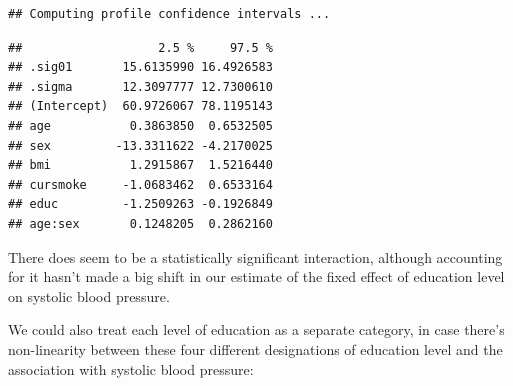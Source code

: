\documentclass[
]{book}
\newenvironment{Shaded}{\begin{snugshade}}{\end{snugshade}}
\newcommand{\DataTypeTok}[1]{\textcolor[rgb]{0.13,0.29,0.53}{#1}}
\newcommand{\DecValTok}[1]{\textcolor[rgb]{0.00,0.00,0.81}{#1}}
\newcommand{\KeywordTok}[1]{\textcolor[rgb]{0.13,0.29,0.53}{\textbf{#1}}}
\newcommand{\NormalTok}[1]{#1}
\newcommand{\OperatorTok}[1]{\textcolor[rgb]{0.81,0.36,0.00}{\textbf{#1}}}
\newcommand{\StringTok}[1]{\textcolor[rgb]{0.31,0.60,0.02}{#1}}
\begin{document}
\begin{Shaded}
\end{Shaded}

\begin{verbatim}
## Computing profile confidence intervals ...
\end{verbatim}

\begin{verbatim}
##                   2.5 %     97.5 %
## .sig01       15.6135990 16.4926583
## .sigma       12.3097777 12.7300610
## (Intercept)  60.9726067 78.1195143
## age           0.3863850  0.6532505
## sex         -13.3311622 -4.2170025
## bmi           1.2915867  1.5216440
## cursmoke     -1.0683462  0.6533164
## educ         -1.2509263 -0.1926849
## age:sex       0.1248205  0.2862160
\end{verbatim}

There does seem to be a statistically significant interaction, although
accounting for it hasn't made a big shift in our estimate of the fixed effect
of education level on systolic blood pressure.

We could also treat each level of education as a separate category, in case
there's non-linearity between these four different designations of education
level and the association with systolic blood pressure:

\begin{Shaded}
\end{Shaded}
\end{document}
